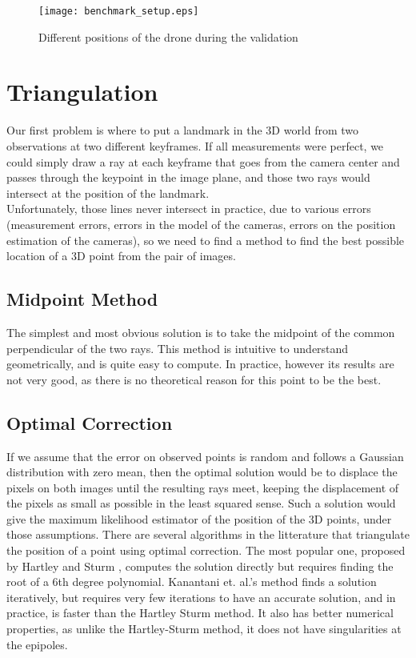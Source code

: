 \begin{figure}[H]
  \centering
  \texttt{[image: benchmark\_setup.eps]}
  \label{fig:benchmarksetup}
  \caption{Different positions of the drone during the validation}
\end{figure}


\section{Triangulation}
Our first problem is where to put a landmark in the 3D world from two observations at two different keyframes. If all measurements were perfect, we could simply draw a ray at each keyframe that goes from the camera center and passes through the keypoint in the image plane, and those two rays would intersect at the position of the landmark. \\
Unfortunately, those lines never intersect in practice, due to various errors (measurement errors, errors in the model of the cameras, errors on the position estimation of the cameras), so we need to find a method to find the best possible location of a 3D point from the pair of images.

\subsection{Midpoint Method}
The simplest and most obvious solution is to take the midpoint of the common perpendicular of the two rays. This method is intuitive to understand geometrically, and is quite easy to compute. In practice, however its results are not very good, as there is no theoretical reason for this point to be the best.

\subsection{Optimal Correction}
If we assume that the error on observed points is random and follows a Gaussian distribution with zero mean, then the optimal solution would be to displace the pixels on both images until the resulting rays meet, keeping the displacement of the pixels as small as possible in the least squared sense. Such a solution would give the maximum likelihood estimator of the position of the 3D points, under those assumptions.
There are several algorithms in the litterature that triangulate the position of a point using optimal correction. The most popular one, proposed by Hartley and Sturm \cite{hartleysturm}, computes the solution directly but requires finding the root of a 6th degree polynomial. Kanantani et. al.'s method \cite{kanatani} finds a solution iteratively, but requires very few iterations to have an accurate solution, and in practice, is faster than the Hartley Sturm method. It also has better numerical properties, as unlike the Hartley-Sturm method, it does not have singularities at the epipoles.

